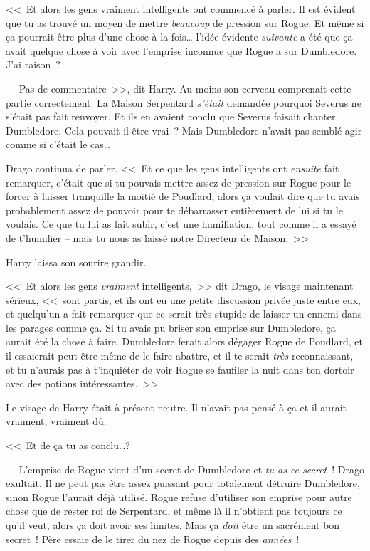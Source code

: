 <<~Et alors les gens vraiment intelligents ont commencé à parler. Il est évident que tu as trouvé un moyen de mettre \emph{beaucoup} de pression sur Rogue. Et même si ça pourrait être plus d'une chose à la fois… l'idée évidente \emph{suivante} a été que ça avait quelque chose à voir avec l'emprise inconnue que Rogue a sur Dumbledore. J'ai raison~?

--- Pas de commentaire~>>, dit Harry. Au moins son cerveau comprenait cette partie correctement. La Maison Serpentard \emph{s'était} demandée pourquoi Severus ne s'était pas fait renvoyer. Et ils en avaient conclu que Severus faisait chanter Dumbledore. Cela pouvait-il être vrai~? Mais Dumbledore n'avait pas semblé agir comme si c'était le cas…

Drago continua de parler. <<~Et ce que les gens intelligents ont \emph{ensuite} fait remarquer, c'était que si tu pouvais mettre assez de pression sur Rogue pour le forcer à laisser tranquille la moitié de Poudlard, alors ça voulait dire que tu avais probablement assez de pouvoir pour te débarrasser entièrement de lui si tu le voulais. Ce que tu lui as fait subir, c'est une humiliation, tout comme il a essayé de t'humilier -- mais tu nous as laissé notre Directeur de Maison.~>>

Harry laissa son sourire grandir.

<<~Et alors les gens \emph{vraiment} intelligents,~>> dit Drago, le visage maintenant sérieux, <<~sont partis, et ils ont eu une petite discussion privée juste entre eux, et quelqu'un a fait remarquer que ce serait très stupide de laisser un ennemi dans les parages comme ça. Si tu avais pu briser son emprise sur Dumbledore, ça aurait été la chose à faire. Dumbledore ferait alors dégager Rogue de Poudlard, et il essaierait peut-être même de le faire abattre, et il te serait \emph{très} reconnaissant, et tu n'aurais pas à t'inquiéter de voir Rogue se faufiler la nuit dans ton dortoir avec des potions intéressantes.~>>

Le visage de Harry était à présent neutre. Il n'avait pas pensé à ça et il aurait vraiment, vraiment dû.

<<~Et de ça tu as conclu…?

--- L'emprise de Rogue vient d'un secret de Dumbledore et \emph{tu as ce secret}~! Drago exultait. Il ne peut pas être assez puissant pour totalement détruire Dumbledore, sinon Rogue l'aurait déjà utilisé. Rogue refuse d'utiliser son emprise pour autre chose que de rester roi de Serpentard, et même là il n'obtient pas toujours ce qu'il veut, alors ça doit avoir ses limites. Mais ça \emph{doit} être un sacrément bon secret~! Père essaie de le tirer du nez de Rogue depuis des \emph{années}~!

